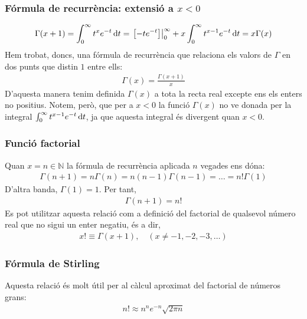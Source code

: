 \subsubsection*{Fórmula de recurrència: extensió a $x<0$}
\begin{align}
    \Gamma (x + 1) = \int_{0}^{\infty} t^{x} e^{-t} \mathop{}\!\mathrm{d} t = \left. \left[ -t e^{-t} \right] \right|_{0}^{\infty} + x \int_{0}^{\infty} t^{x-1} e^{-t} \mathop{}\!\mathrm{d} t = x \Gamma (x)
\end{align}
Hem trobat, doncs, una fórmula de recurrència que relaciona els valors de $\Gamma$ en dos punts que distin $1$ entre ells:
\begin{align}
    \Gamma (x) = \frac{\Gamma (x+1)}{x}
\end{align}
D'aquesta manera tenim definida $\Gamma (x)$ a tota la recta real excepte ens els enters no positius. Notem, però, que per a $x < 0$ la funció $\Gamma (x)$ no ve donada per la integral $\int_{0}^{\infty} t^{x-1} e^{-t} \mathop{}\!\mathrm{d} t$, ja que aquesta integral és divergent quan $x < 0$.

\subsubsection*{Funció factorial}
Quan $x = n \in \mathbb{N}$ la fórmula de recurrència aplicada $n$ vegades ens dóna:
\begin{align*}
    \Gamma (n+1) = n \Gamma (n) = n(n-1) \Gamma (n-1) = \dots = n! \Gamma (1)
\end{align*}
D'altra banda, $\Gamma (1) = 1$. Per tant, 
\begin{align}
    \Gamma (n+1) = n!
\end{align}
Es pot utilitzar aquesta relació com a definició del factorial de qualsevol número real que no sigui un enter negatiu, és a dir,
\begin{align}
    x! \equiv \Gamma (x+1) , \quad (x \neq -1, -2, -3, \dots)
\end{align}

\subsubsection*{Fórmula de Stirling}
Aquesta relació és molt útil per al càlcul aproximat del factorial de números grans:
\begin{align}
    n! \approx n^{n} e^{-n} \sqrt{2 \pi n}
\end{align}